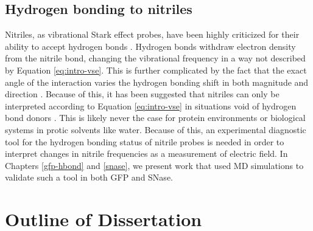 \subsection{Hydrogen bonding to nitriles} 

Nitriles, as vibrational Stark effect probes, have been highly criticized for their ability to accept hydrogen bonds \cite{Adhikary2014, Adhikary2015}. 
Hydrogen bonds withdraw electron density from the nitrile bond, changing the vibrational frequency in a way not described by Equation \ref{eq:intro-vse}. 
This is further complicated by the fact that the exact angle of the interaction varies the hydrogen bonding shift in both magnitude and direction \cite{Choi2008, First2018}.  
Because of this, it has been suggested that nitriles can only be interpreted according to Equation \ref{eq:intro-vse} in situations void of hydrogen bond donors \cite{Adhikary2014}. 
This is likely never the case for protein environments or biological systems in protic solvents like water. 
Because of this, an experimental diagnostic tool for the hydrogen bonding status of nitrile probes is needed in order to interpret changes in nitrile frequencies as a measurement of electric field. 
In Chapters \ref{gfp-hbond} and \ref{snase}, we present work that used MD simulations to validate such a tool in both GFP and SNase.  

\section{Outline of Dissertation} 

